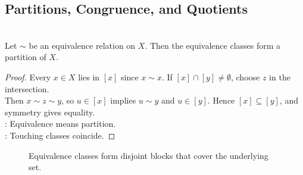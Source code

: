 \subsection{Partitions, Congruence, and Quotients}

\begin{proposition} \label{prop:equivalence-relations-partitions} \\
Let $\sim$ be an equivalence relation on $X$. Then the equivalence classes form a partition of $X$.
\begin{proof}
Every $x\in X$ lies in $[x]$ since $x\sim x$. If $[x]\cap[y]\neq\emptyset$, choose $z$ in the intersection.\\
Then $x\sim z\sim y$, so $u\in[x]$ implies $u\sim y$ and $u\in[y]$. Hence $[x]\subseteq[y]$, and symmetry gives equality.\\
: Equivalence means partition.\\
: Touching classes coincide.
\end{proof}
\end{proposition}

\begin{figure}[H]
  \centering
  
  \caption{Equivalence classes form disjoint blocks that cover the underlying set.}
  \label{fig:equivalence-classes-partition}
\end{figure}

